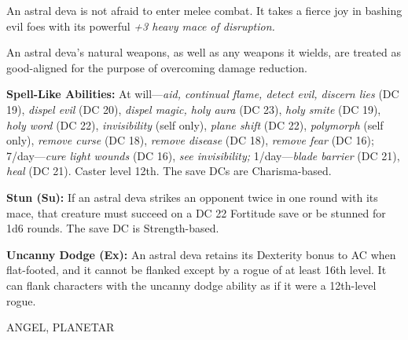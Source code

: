 \documentclass{article}
\begin{document}
An astral deva is not afraid to enter melee combat. It takes a fierce joy in bashing 
evil foes with its powerful \textit{+3 heavy mace of disruption.}

An astral deva's natural weapons, as well as any weapons it wields, are treated 
as good-aligned for the purpose of overcoming damage reduction.

\textbf{Spell-Like Abilities:} At will---\textit{aid, continual flame, detect evil, 
discern lies }(DC 19), \textit{dispel evil }(DC 20), \textit{dispel magic, holy 
aura }(DC 23), \textit{holy smite }(DC 19), \textit{holy word }(DC 22), \textit{invisibility 
}(self only), \textit{plane shift }(DC 22), \textit{polymorph }(self only), \textit{remove 
curse }(DC 18), \textit{remove disease }(DC 18), \textit{remove fear }(DC 16); 
7/day---\textit{cure light wounds }(DC 16), \textit{see invisibility; }1/day---\textit{blade 
barrier }(DC 21), \textit{heal }(DC 21). Caster level 12th. The save DCs are Charisma-based.

\textbf{Stun (Su):} If an astral deva strikes an opponent twice in one round with 
its mace, that creature must succeed on a DC 22 Fortitude save or be stunned for 
1d6 rounds. The save DC is Strength-based.

\textbf{Uncanny Dodge (Ex):} An astral deva retains its Dexterity bonus to AC when 
flat-footed, and it cannot be flanked except by a rogue of at least 16th level. 
It can flank characters with the uncanny dodge ability as if it were a 12th-level 
rogue.

\vspace{12pt}
ANGEL, PLANETAR
\end{document}
